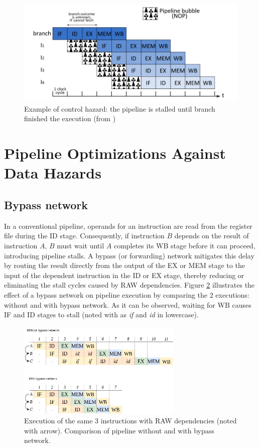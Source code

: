 \begin{figure}[H]
    \includegraphics[width=\textwidth]{figures/pipeline-bubbles.png}
    \caption{Example of control hazard: the pipeline is stalled until branch finished the execution (from \cite{perais_increasing_2016})}
    \label{fig:bubbles}
\end{figure}

\section{Pipeline Optimizations Against Data Hazards}

\subsection{Bypass network}

In a conventional pipeline, operands for an instruction are read from the register file during the ID stage. Consequently, if instruction $B$ depends on the result of instruction $A$, $B$ must wait until $A$ completes its WB stage before it can proceed, introducing pipeline stalls. A bypass (or forwarding) network mitigates this delay by routing the result directly from the output of the EX or MEM stage to the input of the dependent instruction in the ID or EX stage, thereby reducing or eliminating the stall cycles caused by RAW dependencies. Figure \ref{fig:bypass-network} illustrates the effect of a bypass network on pipeline execution by comparing the 2 executions: without and with bypass network. As it can be observed, waiting for WB causes IF and ID stages to stall (noted with as \textit{if} and \textit{id} in lowercase).

\begin{figure}[H]
    \centering
    \includegraphics[width=0.7\textwidth]{figures/bypass network.png}
    \caption{Execution of the same 3 instructions with RAW dependencies (noted with arrow). Comparison of pipeline without and with bypass network.}
    \label{fig:bypass-network}
\end{figure}

